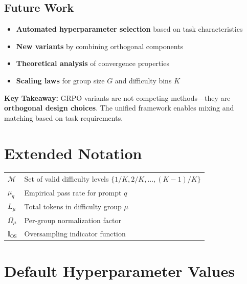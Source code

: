 \documentclass[11pt,a4paper]{article}
\begin{document}
\subsection{Future Work}

\begin{itemize}
    \item \textbf{Automated hyperparameter selection} based on task characteristics
    \item \textbf{New variants} by combining orthogonal components
    \item \textbf{Theoretical analysis} of convergence properties
    \item \textbf{Scaling laws} for group size $G$ and difficulty bins $K$
\end{itemize}

\begin{tipbox}
\textbf{Key Takeaway:} GRPO variants are not competing methods—they are \textbf{orthogonal design choices}. The unified framework enables mixing and matching based on task requirements.
\end{tipbox}

\newpage


\appendix

\section{Extended Notation}

\begin{center}
\begin{tabular}{@{}ll@{}}
\toprule
$\mathcal{M}$ & Set of valid difficulty levels $\{1/K, 2/K, \ldots, (K-1)/K\}$ \\
$\mu_q$ & Empirical pass rate for prompt $q$ \\
$L_\mu$ & Total tokens in difficulty group $\mu$ \\
$\Omega_\mu$ & Per-group normalization factor \\
$\mathbb{I}_{\text{OS}}$ & Oversampling indicator function \\
\bottomrule
\end{tabular}
\end{center}

\section{Default Hyperparameter Values}
\end{document}
